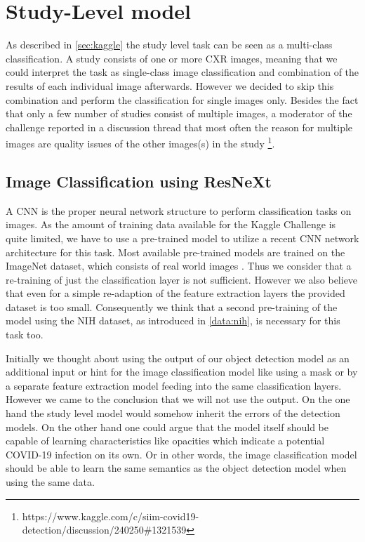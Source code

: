 \section{Study-Level model}

As described in \ref{sec:kaggle} the study level task can be seen as a multi-class classification. A study consists of one or more \ac{CXR} images, meaning that we could interpret the task as single-class image classification and combination of the results of each individual image afterwards. However we decided to skip this combination and perform the classification for single images only. Besides the fact that only a few number of studies consist of multiple images, a moderator of the challenge reported in a discussion thread that most often the reason for multiple images are quality issues of the other images(s) in the study \footnote{https://www.kaggle.com/c/siim-covid19-detection/discussion/240250\#1321539}.

\subsection*{Image Classification using ResNeXt}
A \ac{CNN} is the proper neural network structure to perform classification tasks on images. As the amount of training data available for the Kaggle Challenge is quite limited, we have to use a pre-trained model to utilize a recent \ac{CNN} network architecture for this task. Most available pre-trained models are trained on the ImageNet dataset, which consists of real world images \autocite{deng_imagenet_2009}. Thus we consider that a re-training of just the classification layer is not sufficient. However we also believe that even for a simple re-adaption of the feature extraction layers the provided dataset is too small. Consequently we think that a second pre-training of the model using the NIH dataset, as introduced in \ref{data:nih}, is necessary for this task too.

Initially we thought about using the output of our object detection model as an additional input or hint for the image classification model like using a mask or by a separate feature extraction model feeding into the same classification layers. However we came to the conclusion that we will not use the output. On the one hand the study level model would somehow inherit the errors of the detection models. On the other hand one could argue that the model itself should be capable of learning characteristics like opacities which indicate a potential COVID-19 infection on its own. Or in other words, the image classification model should be able to learn the same semantics as the object detection model when using the same data.

